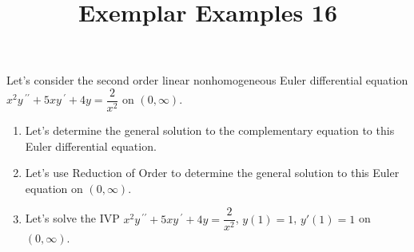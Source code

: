 \documentclass{ximera}
\begin{document}
\begin{abstract}
 \end{abstract}

    \title{Exemplar Examples 16}
    
    \maketitle

Let's consider the second order linear nonhomogeneous Euler differential equation $x^2y\,^{\prime\prime}+5xy\,^{\prime}+4y=\dfrac{2}{x^2}$ on $(0,\infty)$.


\begin{enumerate}

\item Let's determine the general solution to the complementary equation to this Euler differential equation.


\vfill



\item Let's use Reduction of Order to determine the general solution to this Euler equation on $(0,\infty)$.



\vfill


\vfill

\newpage

\item Let's solve the IVP $x^2y\,^{\prime\prime}+5xy\,^{\prime}+4y=\dfrac{2}{x^2}$, $y(1)=1$, $y'(1)=1$ on $(0,\infty)$.



\vfill

\end{enumerate}
\end{document}
